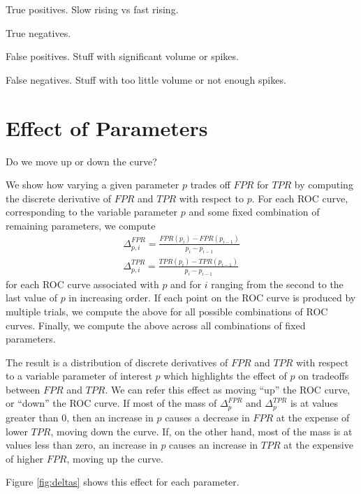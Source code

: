 True positives. Slow rising vs fast rising.

True negatives.

False positives. Stuff with significant volume or spikes.

False negatives. Stuff with too little volume or not enough spikes.

\section{Effect of Parameters}

Do we move up or down the curve?

We show how varying a given parameter $p$ trades off $FPR$ for $TPR$ by
computing the discrete derivative of $FPR$ and $TPR$ with respect to $p$. For
each ROC curve, corresponding to the variable parameter $p$ and some fixed
combination of remaining parameters, we compute
\begin{gather}
\Delta_{p,i}^{FPR} = \frac{FPR(p_{i}) - FPR(p_{i-1})}{p_i - p_{i-1}}\\
\Delta_{p,i}^{TPR} = \frac{TPR(p_{i}) - TPR(p_{i-1})}{p_i - p_{i-1}}
\end{gather}
for each ROC curve associated with $p$ and for $i$ ranging from the second to the last value
of $p$ in increasing order. If each point on the ROC curve is produced by
multiple trials, we compute the above for all possible combinations of ROC
curves. Finally, we compute the above across all combinations of fixed
parameters.

The result is a distribution of discrete derivatives of $FPR$ and $TPR$ with
respect to a variable parameter of interest $p$ which highlights the effect of
$p$ on tradeoffs between $FPR$ and $TPR$. We can refer this effect as moving
``up'' the ROC curve, or ``down'' the ROC curve. If most of the mass of
$\Delta_{p}^{FPR}$ and $\Delta_{p}^{TPR}$ is at values greater than 0, then an
increase in $p$ causes a decrease in $FPR$ at the expense of lower $TPR$, moving
down the curve. If, on the other hand, most of the mass is at values less than
zero, an increase in $p$ causes an increase in $TPR$ at the expensive of higher
$FPR$, moving up the curve.

Figure \ref{fig:deltas} shows this effect for each parameter.

